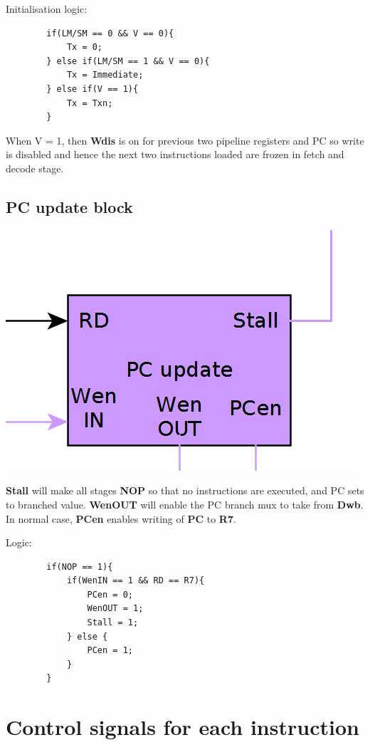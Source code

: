 \documentclass{article}
\begin{document}
Initialisation logic:
    \begin{lstlisting}
        if(LM/SM == 0 && V == 0){
            Tx = 0;
        } else if(LM/SM == 1 && V == 0){
            Tx = Immediate;
        } else if(V == 1){
            Tx = Txn;
        }
    \end{lstlisting}

When V = 1, then \textbf{Wdis} is on for previous two pipeline registers and PC
so write is disabled and hence the next two instructions loaded are frozen in
fetch and decode stage.

\subsection*{PC update block}

\includegraphics[scale=0.5]{pc}

\textbf{Stall} will make all stages \textbf{NOP} so that no instructions are executed,
and PC sets to branched value.
\textbf{WenOUT} will enable the PC branch mux to take from \textbf{Dwb}.
In normal case, \textbf{PCen} enables writing of \textbf{PC} to \textbf{R7}.

Logic:
    \begin{lstlisting}
        if(NOP == 1){
            if(WenIN == 1 && RD == R7){
                PCen = 0;
                WenOUT = 1;
                Stall = 1;
            } else {
                PCen = 1;
            }
        }
    \end{lstlisting}


\section*{Control signals for each instruction}
\end{document}
